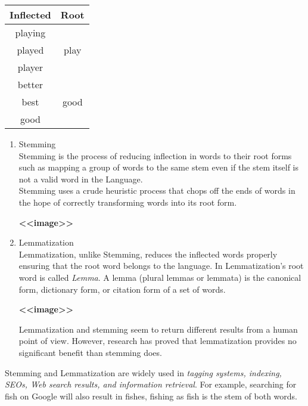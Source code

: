 \documentclass{article}
\begin{document}
\begin{enumerate}[label=2.\arabic*]
    \begin{center}
        \begin{tabular}{|c|c|}
            \hline 
            \textbf{Inflected} & \textbf{Root} \\
            \hline
            playing & \\
            played & play\\
            player & \\
            \hline
            better & \\
            best & good\\ 
            good & \\ 
            \hline
        \end{tabular}
    \end{center}

    \begin{enumerate}[label=2.2.\arabic*]
        \item Stemming \\
        Stemming is the process of reducing inflection in words to their root forms such as mapping a group of words to the same stem even if the stem itself is not a valid word in the Language. \\
        Stemming uses a crude heuristic process that chops off the ends of words in the hope of correctly transforming words into its root form. \\
        
        \begin{center}
            \textbf{<<image>>}
        \end{center}
        
        \item Lemmatization \\
        Lemmatization, unlike Stemming, reduces the inflected words properly ensuring that the root word belongs to the language. In Lemmatization’s root word is called \emph{Lemma}. 
        A lemma (plural lemmas or lemmata) is the canonical form, dictionary form, or citation form of a set of words.\\
        \begin{center}
            \textbf{<<image>>}
        \end{center}
        Lemmatization and stemming seem to return different results from a human point of view. 
        However, research has proved that lemmatization provides no significant benefit than stemming does.
        
    \end{enumerate}
    Stemming and Lemmatization are widely used in \emph{tagging systems, indexing, SEOs, Web search results, and information retrieval}. 
    For example, searching for fish on Google will also result in fishes, fishing as fish is the stem of both words. \\
    

\end{enumerate}
\end{document}
